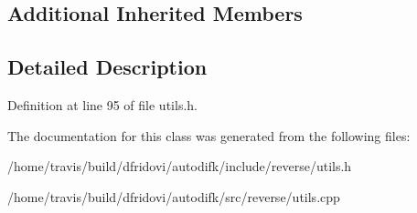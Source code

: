 \subsection*{Additional Inherited Members}


\subsection{Detailed Description}


Definition at line 95 of file utils.\-h.



The documentation for this class was generated from the following files\-:\begin{DoxyCompactItemize}
\item 
/home/travis/build/dfridovi/autodifk/include/reverse/utils.\-h\item 
/home/travis/build/dfridovi/autodifk/src/reverse/utils.\-cpp\end{DoxyCompactItemize}

